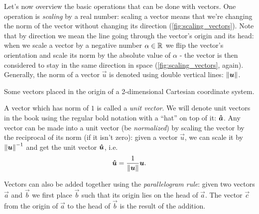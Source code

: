 Let's now overview the basic operations that can be done with vectors. One operation is \textit{scaling} by a real number: scaling a vector means that we're changing the norm of the vector without changing its direction (\cref{fig:scaling_vectors}). Note that by direction we mean the line going through the vector's origin and its head: when we scale a vector by a negative number $\alpha\in\mathbb{R}^{}$ we flip the vector's orientation and scale its norm by the absolute value of $\alpha$ - the vector is then considered to stay in the same direction in space (\cref{fig:scaling_vectors}, again). Generally, the norm of a vector $\vec{u}$ is denoted using double vertical lines: $\left\| \bm{u} \right\|$.

\begin{marginfigure}
    \caption{Some vectors placed in the origin of a 2-dimensional Cartesian coordinate system.}
    \label{fig:scaling_vectors}
\end{marginfigure}

A vector which has norm of $1$ is called a \textit{unit vector}. We will denote unit vectors in the book using the regular bold notation with a \enquote{hat} on top of it: $\bm{\hat{a}}$. Any vector can be made into a unit vector (be \textit{normalized}) by scaling the vector by the reciprocal of its norm (if it isn't zero): given a vector $\vec{u}$, we can scale it by $\left\| \bm{u} \right\|^{-1}$ and get the unit vector $\bm{\hat{u}}$, i.e.
\begin{equation}
    \bm{\hat{u}} = \frac{1}{\left\| \bm{u} \right\|}\bm{u}.
    \label{eq:label}
\end{equation}

Vectors can also be added together using the \textit{parallelogram rule}: given two vectors $\vec{a}$ and $\vec{b}$ we first place $\vec{b}$ such that its origin lies on the head of $\vec{a}$. The vector $\vec{c}$ from the origin of $\vec{a}$ to the head of $\vec{b}$ is the result of the addition.

